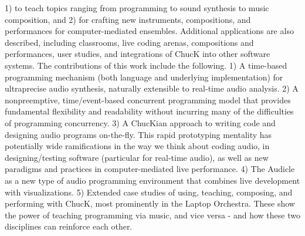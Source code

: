 1) to teach topics ranging from programming to sound synthesis to music composition, and 2) for crafting new instruments, compositions, and performances for
computer-mediated ensembles. Additional applications are also described, including classrooms, live coding arenas, compositions and performances, user studies,
and integrations of ChucK into other software systems.
The contributions of this work include the following. 1) A time-based programming mechanism (both language and underlying implementation) for ultraprecise audio synthesis, naturally extensible to real-time audio analysis. 2) A nonpreemptive, time/event-based concurrent programming model that provides fundamental flexibility and readability without incurring many of the difficulties of
programming concurrency. 3) A ChucKian approach to writing code and designing audio programs on-the-fly. This rapid prototyping mentality has potentially
wide ramifications in the way we think about coding audio, in designing/testing
software (particular for real-time audio), as well as new paradigms and practices
in computer-mediated live performance. 4) The Audicle as a new type of audio
programming environment that combines live development with visualizations. 5)
Extended case studies of using, teaching, composing, and performing with ChucK,
most prominently in the Laptop Orchestra. These show the power of teaching programming via music, and vice versa - and how these two disciplines can reinforce
each other.
